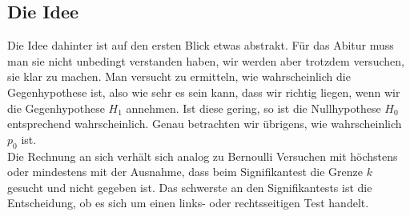\subsection{Die Idee}
	Die Idee dahinter ist auf den ersten Blick etwas abstrakt. Für das Abitur muss
	man sie nicht unbedingt verstanden haben, wir werden aber trotzdem versuchen,
	sie klar zu machen. Man versucht zu ermitteln, wie wahrscheinlich die
	Gegenhypothese ist, also wie sehr es sein kann, dass wir richtig liegen, wenn
	wir die Gegenhypothese \(H_1\) annehmen. Ist diese gering, so ist die
	Nullhypothese \(H_0\) entsprechend wahrscheinlich. Genau betrachten wir
	übrigens, wie wahrscheinlich \(p_0\) ist.\\
	Die Rechnung an sich verhält sich analog zu Bernoulli Versuchen mit höchstens
	oder mindestens mit der Ausnahme, dass beim Signifikantest die Grenze \(k\)
	gesucht und nicht gegeben ist. Das schwerste an den Signifikantests ist die
	Entscheidung, ob es sich um einen links- oder rechtsseitigen Test handelt.
